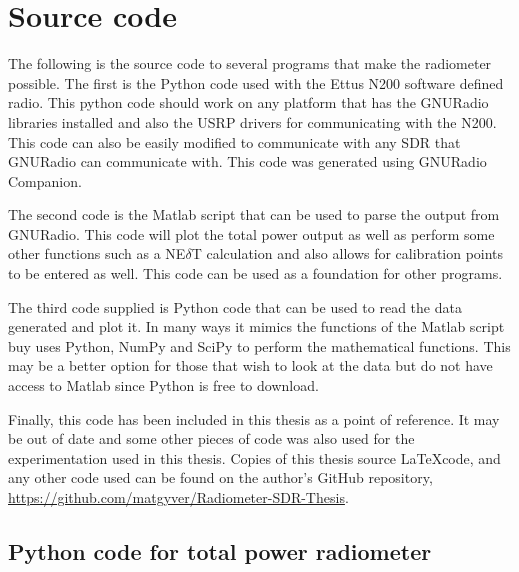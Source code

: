 \appendixtitle
\appendix
\chapter{Source code}

The following is the source code to several programs that make the radiometer possible.  The first is the Python code used with the Ettus N200 software defined radio.  This python code should work on any platform that has the GNURadio libraries installed and also the USRP drivers for communicating with the N200.  This code can also be easily modified to communicate with any SDR that GNURadio can communicate with.  This code was generated using GNURadio Companion.  

The second code is the Matlab script that can be used to parse the output from GNURadio.  This code will plot the total power output as well as perform some other functions such as a NE$\delta$T calculation and also allows for calibration points to be entered as well.  This code can be used as a foundation for other programs.  

The third code supplied is Python code that can be used to read the data generated and plot it.  In many ways it mimics the functions of the Matlab script buy uses Python, NumPy and SciPy to perform the mathematical functions.  This may be a better option for those that wish to look at the data but do not have access to Matlab since Python is free to download.

Finally, this code has been included in this thesis as a point of reference.  It may be out of date and some other pieces of code was also used for the experimentation used in this thesis.  Copies of this thesis source \LaTeX code, and any other code used can be found on the author's GitHub repository, \url{https://github.com/matgyver/Radiometer-SDR-Thesis}.


\section*{Python code for total power radiometer}

\newcommand{\code}[2]{
  \hrulefill
  \subsection*{#1}
  
  \vspace{2em}
}

